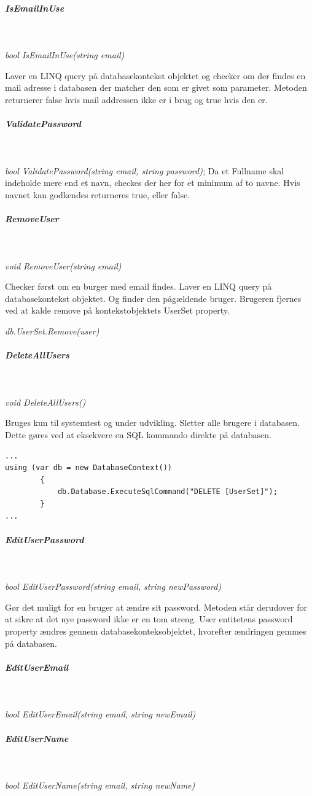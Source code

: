 \subparagraph{IsEmailInUse}\

\textit{bool IsEmailInUse(string email)}

Laver en LINQ query på databasekontekst objektet og checker om der findes en mail adresse i databasen der matcher den som er givet som parameter. Metoden returnerer false hvis mail addressen ikke er i brug og true hvis den er.

\subparagraph{ValidatePassword}\

\textit{bool ValidatePassword(string email, string password);}
Da et Fullname skal indeholde mere end et navn, checkes der her for et minimum af to navne. Hvis navnet kan godkendes returneres true, eller false.

\subparagraph{RemoveUser}\

\textit{void RemoveUser(string email)}

Checker først om en burger med email findes.
Laver en LINQ query på databasekontekst objektet. Og finder den pågældende bruger.
Brugeren fjernes ved at kalde remove på kontekstobjektets UserSet property.

\textit{db.UserSet.Remove(user)}

\subparagraph{DeleteAllUsers}\

\textit{void DeleteAllUsers()}

Bruges kun til systemtest og under udvikling.
Sletter alle brugere i databasen. Dette gøres ved at eksekvere en SQL kommando direkte på databasen. 

\begin{lstlisting}[caption=SQL injection på databasen ved sletning af brugere, label=sqlDeleteUsers]
...
using (var db = new DatabaseContext())
		{
			db.Database.ExecuteSqlCommand("DELETE [UserSet]");
		}
...	
\end{lstlisting}

\subparagraph{EditUserPassword}\

\textit{bool EditUserPassword(string email, string newPassword)}

Gør det muligt for en bruger at ændre sit password. Metoden står derudover for at sikre at det nye password ikke er en tom streng. User entitetens password property ændres gennem databasekonteksobjektet, hvorefter ændringen gemmes på databasen.

\subparagraph{EditUserEmail}\

\textit{bool EditUserEmail(string email, string newEmail)}
\subparagraph{EditUserName}\

\textit{bool EditUserName(string email, string newName)}

